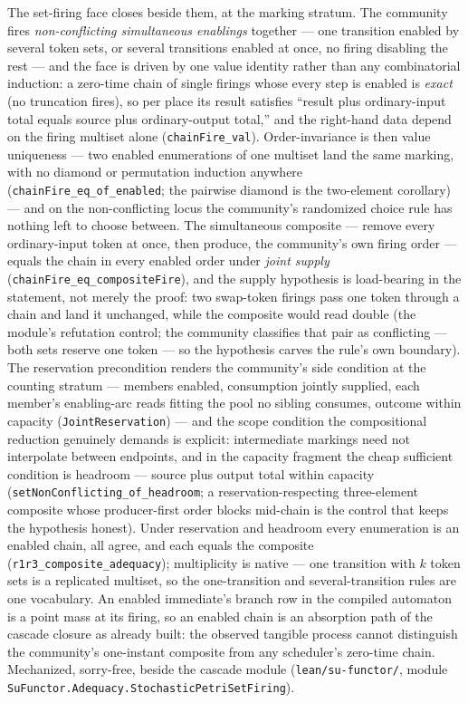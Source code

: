 The set-firing face closes beside them, at the marking stratum.  The
community fires \emph{non-conflicting simultaneous enablings}
together --- one transition enabled by several token sets, or several
transitions enabled at once, no firing disabling the rest
\cite{everdij-blom-2010} --- and the face is driven by one value
identity rather than any combinatorial induction: a zero-time chain
of single firings whose every step is enabled is \emph{exact} (no
truncation fires), so per place its result satisfies ``result plus
ordinary-input total equals source plus ordinary-output total,'' and
the right-hand data depend on the firing multiset alone
(\texttt{chainFire\_val}).  Order-invariance is then value
uniqueness --- two enabled enumerations of one multiset land the same
marking, with no diamond or permutation induction anywhere
(\texttt{chainFire\_eq\_of\_enabled}; the pairwise diamond is the
two-element corollary) --- and on the non-conflicting locus the
community's randomized choice rule has nothing left to choose
between.  The simultaneous composite --- remove every ordinary-input
token at once, then produce, the community's own firing order ---
equals the chain in every enabled order under \emph{joint supply}
(\texttt{chainFire\_eq\_compositeFire}), and the supply hypothesis is
load-bearing in the statement, not merely the proof: two swap-token
firings pass one token through a chain and land it unchanged, while
the composite would read double (the module's refutation control;
the community classifies that pair as conflicting --- both sets
reserve one token --- so the hypothesis carves the rule's own
boundary).  The reservation precondition renders the community's
side condition at the counting stratum --- members enabled,
consumption jointly supplied, each member's enabling-arc reads
fitting the pool no sibling consumes, outcome within capacity
(\texttt{JointReservation}) --- and the scope condition the
compositional reduction genuinely demands is explicit: intermediate
markings need not interpolate between endpoints, and in the capacity
fragment the cheap sufficient condition is headroom --- source plus
output total within capacity
(\texttt{setNonConflicting\_of\_headroom}; a reservation-respecting
three-element composite whose producer-first order blocks mid-chain
is the control that keeps the hypothesis honest).  Under reservation
and headroom every enumeration is an enabled chain, all agree, and
each equals the composite (\texttt{r1r3\_composite\_adequacy});
multiplicity is native --- one transition with $k$ token sets is a
replicated multiset, so the one-transition and several-transition
rules are one vocabulary.  An enabled immediate's branch row in the
compiled automaton is a point mass at its firing, so an enabled
chain is an absorption path of the cascade closure as already built:
the observed tangible process cannot distinguish the community's
one-instant composite from any scheduler's zero-time chain.
Mechanized, sorry-free, beside the cascade module
(\texttt{lean/su-functor/}, module
\texttt{SuFunctor.Adequacy.StochasticPetriSetFiring}).

